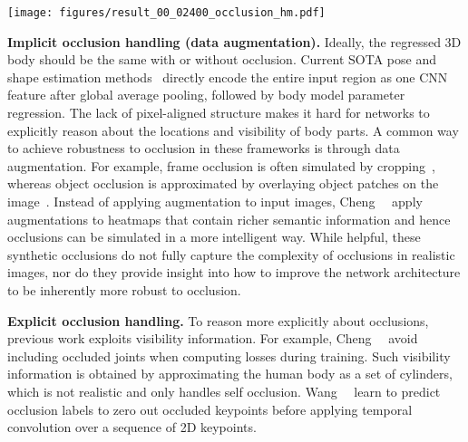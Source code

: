 \documentclass[10pt,twocolumn,letterpaper,usenames,dvipsnames]{article}
\begin{document}
\begin{figure*}[t]
	\centering
	\texttt{[image: figures/result\_00\_02400\_occlusion\_hm.pdf]}
	\vspace{-0.25in}
	\caption{{\bf Occlusion sensitivity analysis.} Heatmaps illustrate the error of SPIN \cite{SPIN:ICCV:2019} in individual joints caused by an occluder placed at each image location.
		Image size: ; occluding patch: . The title of each heatmap names the joint and notes the range of the 3D error in mm visualized in the heatmap.
		See Section~\ref{sec:occlusion_analysis} for analysis.
	}
	\label{fig:occlusion_analysis}
\end{figure*}{}

{\bf Implicit occlusion handling (data augmentation).}
Ideally, the regressed 3D body should be the same with or without occlusion.
Current SOTA pose and shape estimation methods~\cite{kanazawa_hmr,kocabas2019vibe,SPIN:ICCV:2019} directly encode the entire input region as one CNN feature after global average pooling, followed by body model parameter regression. 
The lack of pixel-aligned structure makes it hard for networks to explicitly reason about the locations and  visibility of body parts. 
A common way to achieve robustness to occlusion in these frameworks is through data augmentation. 
For example, frame occlusion is often simulated by cropping~\cite{biggs2020multibodies,joo2020eft,Rockwell2020}, whereas object occlusion is approximated by overlaying object patches on the image~\cite{georgakis2020hierarchical,sarandi2018robust}. Instead of applying augmentation to input images, Cheng~\etal~\cite{cheng20203d} apply augmentations to heatmaps that contain richer semantic information and hence occlusions can be simulated in a more intelligent way.
While helpful, these synthetic occlusions do not fully capture the complexity of occlusions in realistic images, nor do they provide insight into how to improve the network architecture to be inherently more robust to occlusion.

{\bf Explicit occlusion handling.}
To reason more explicitly about occlusions, previous work exploits visibility information. 
For example, Cheng~\etal~\cite{cheng2019occlusion} avoid including occluded joints when computing losses during training. Such visibility information is obtained by approximating the human body as a set of cylinders, which is not realistic and only handles self occlusion. Wang~\etal~\cite{wang20203d} learn to predict occlusion labels to zero out occluded keypoints before applying temporal convolution over a sequence of 2D keypoints.
\end{document}
